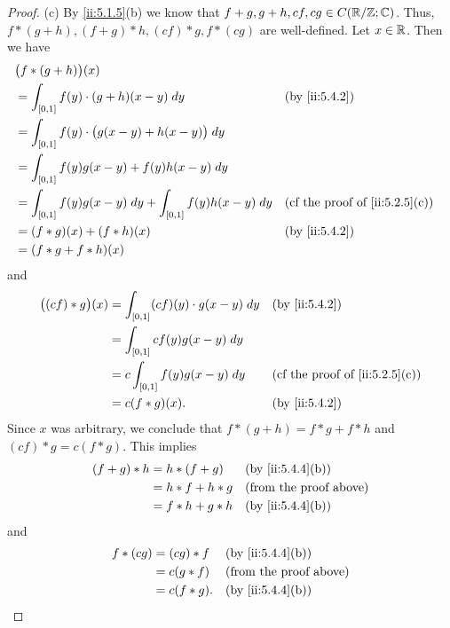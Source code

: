 \begin{proof}{(c)}
  By \cref{ii:5.1.5}(b) we know that \(f + g, g + h, cf, cg \in C(\mathbb{R} / \mathbb{Z} ; \mathbb{C})\).
  Thus, \(f * (g + h), (f + g) * h, (cf) * g, f * (cg)\) are well-defined.
  Let \(x \in \mathbb{R}\).
  Then we have
  \begin{align*}
     & \big(f * (g + h)\big)(x)                                                                                                 \\
     & = \int_{[0, 1]} f(y) \cdot (g + h)(x - y) \; dy                         &  & \by{ii:5.4.2}                               \\
     & = \int_{[0, 1]} f(y) \cdot \big(g(x - y) + h(x - y)\big) \; dy                                                           \\
     & = \int_{[0, 1]} f(y) g(x - y) + f(y) h(x - y) \; dy                                                                      \\
     & = \int_{[0, 1]} f(y) g(x - y) \; dy + \int_{[0, 1]} f(y) h(x - y) \; dy &  & \text{(cf the proof of \cref{ii:5.2.5}(c))} \\
     & = (f * g)(x) + (f * h)(x)                                               &  & \by{ii:5.4.2}                               \\
     & = (f * g + f * h)(x)
  \end{align*}
  and
  \begin{align*}
    \big((cf) * g\big)(x) & = \int_{[0, 1]} (cf)(y) \cdot g(x - y) \; dy &  & \by{ii:5.4.2}                               \\
                          & = \int_{[0, 1]} c f(y) g(x - y) \; dy                                                         \\
                          & = c \int_{[0, 1]} f(y) g(x - y) \; dy        &  & \text{(cf the proof of \cref{ii:5.2.5}(c))} \\
                          & = c (f * g)(x).                              &  & \by{ii:5.4.2}
  \end{align*}
  Since \(x\) was arbitrary, we conclude that \(f * (g + h) = f * g + f * h\) and \((cf) * g = c (f * g)\).
  This implies
  \begin{align*}
    (f + g) * h & = h * (f + g)   &  & \by{ii:5.4.4}[b]              \\
                & = h * f + h * g &  & \text{(from the proof above)} \\
                & = f * h + g * h &  & \by{ii:5.4.4}[b]
  \end{align*}
  and
  \begin{align*}
    f * (cg) & = (cg) * f  &  & \by{ii:5.4.4}[b]              \\
             & = c(g * f)  &  & \text{(from the proof above)} \\
             & = c(f * g). &  & \by{ii:5.4.4}[b]
  \end{align*}
\end{proof}

